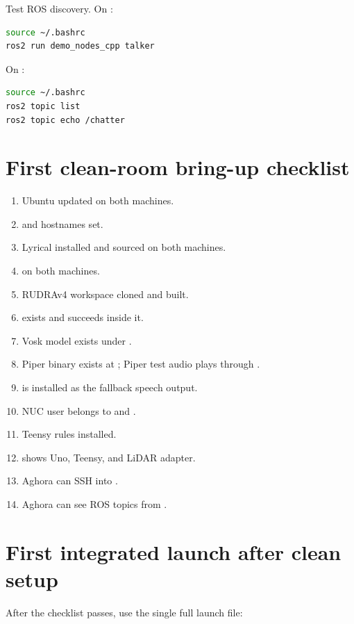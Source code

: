 Test ROS discovery.  On :

\begin{lstlisting}[language=bash,caption={Publish a topic from the NUC.}]
source ~/.bashrc
ros2 run demo_nodes_cpp talker
\end{lstlisting}

On :

\begin{lstlisting}[language=bash,caption={Listen from the workstation.}]
source ~/.bashrc
ros2 topic list
ros2 topic echo /chatter
\end{lstlisting}

\section{First clean-room bring-up checklist}
\begin{enumerate}
  \item Ubuntu updated on both machines.
  \item {} and  hostnames set.
  \item \ros{} Lyrical installed and sourced on both machines.
  \item {} on both machines.
  \item RUDRAv4 workspace cloned and built.
  \item {} exists and  succeeds inside it.
  \item Vosk model exists under .
  \item Piper binary exists at ; Piper test audio plays through .
  \item {} is installed as the fallback speech output.
  \item NUC user belongs to  and .
  \item Teensy rules installed.
  \item {} shows Uno, Teensy, and LiDAR adapter.
  \item Aghora can SSH into .
  \item Aghora can see ROS topics from .
\end{enumerate}

\section{First integrated launch after clean setup}
After the checklist passes, use the single full launch file:

